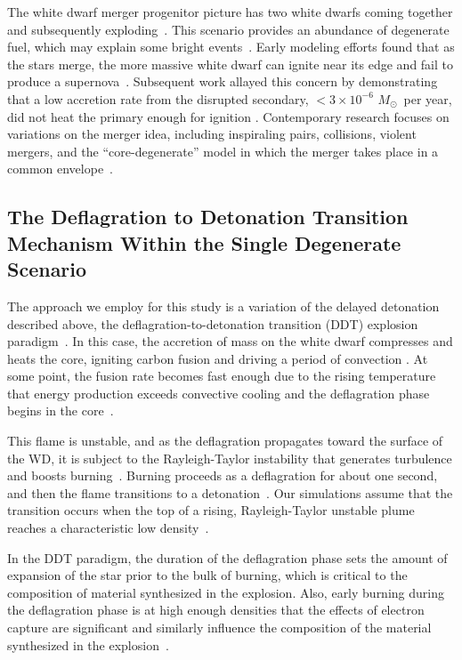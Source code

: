 \documentclass[preprint2]{aastex63}
\newcommand{\Msun}{\ensuremath{M_\odot}}
\begin{document}
{The white dwarf merger progenitor picture has two white dwarfs coming
together and subsequently exploding~\citep{tutukovyungelson76,tutukovyungelson79,
webbink84,ibentutukov84}. This scenario provides an abundance of degenerate fuel,
which may explain some bright events~\citep{scalzo:2010,Yuan:2010}.
Early modeling efforts found that as the stars merge, the more massive white 
dwarf can ignite near its edge and fail to produce a 
supernova~\citep{saionomoto1985,saionomoto2004,Shenetal12}. 
Subsequent work allayed this concern by demonstrating
that a low accretion rate from the disrupted secondary, $ < 3 \times 
10^{-6}$ \Msun\ per year, did not heat the primary enough for ignition
\citep{kawai1987,saionomoto2004,yoonetal2007,lorenaguilaretal2009, 
pakmoretal2012b}. Contemporary
research focuses on variations on the merger idea, including inspiraling pairs,
collisions, violent mergers, and the ``core-degenerate'' model in which the merger
takes place in a common envelope~\citep{raskinetal2009,pakmoretal2011,kashi:2011,
pakmoretal2012a,Shenetal12,katzetal2016,brooksetalfast2017}.


\subsection{The Deflagration to Detonation Transition Mechanism Within
the Single Degenerate Scenario}

The approach we employ for this study is a variation of the delayed
detonation described above, the deflagration-to-detonation transition (DDT)
explosion paradigm~\citep{1986SvAL,
Khokhlov1991Delayed-detonat,NiemWoos97,Niem99,belletal2004,fishjump2015}.
In this case, the accretion of mass on the white dwarf compresses and
heats the core, igniting carbon fusion and driving a period of convection
\citep{WoosWunsKuhl04,wunschwoosley2004,Kuhletal06,nonakaetal2012}.
At some point, the fusion rate becomes fast enough due to the rising
temperature that energy production exceeds convective cooling and
the deflagration phase begins in the core~\citep{Nomo84,WoosWunsKuhl04}.

This flame is unstable, and as the deflagration propagates toward the surface
of the WD, it is subject to the Rayleigh-Taylor instability that generates
turbulence and boosts burning~\citep{taylor+50,chandra+81}.
Burning proceeds as a deflagration for about one second, and then
the flame transitions to a detonation~\citep{hoflich.khokhlov.ea:delayed}.
Our simulations assume that the transition occurs when the top of a
rising, Rayleigh-Taylor unstable plume reaches a characteristic low
density~\citep{townsley.calder.ea:flame}. 

In the DDT paradigm, the duration of the deflagration phase sets
the amount of expansion of the star prior to the bulk of burning,
which is critical to the composition of material synthesized in the 
explosion. Also, early burning during the deflagration phase is at 
high enough densities that the effects of electron capture are 
significant and similarly influence the composition of the material
synthesized in the explosion~\citep{hoeflichetal2004,
hoeflich2006,fesenetal2007,diamondetal2018}.
}
\end{document}
